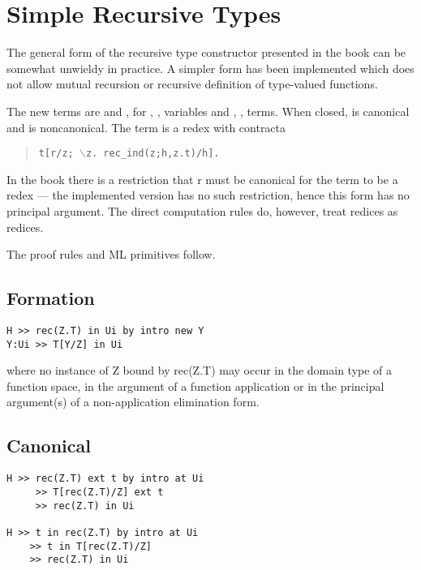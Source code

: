 


\section{Simple Recursive Types}

The general form of the recursive type constructor presented in the book
can be somewhat unwieldy in practice.  A simpler form has been
implemented which does not allow mutual recursion or recursive
definition of type-valued functions.

The new terms are  and , 
for , ,  variables and
, ,  terms.  
When closed,  is canonical and  is
noncanonical.  The term  is a redex with contracta
\begin{quote}
\tt t[r/z; $\backslash$z.  rec\_ind(z;h,z.t)/h].
\end{quote}
In the book there is a restriction
that r must be canonical for the term to be a redex --- the implemented
version has no such restriction, hence this  form has no
principal argument.  The direct computation rules do, however, treat
 redices as redices.

The proof rules and ML primitives follow.


\subsection*{Formation}

\begin{verbatim}
H >> rec(Z.T) in Ui by intro new Y
Y:Ui >> T[Y/Z] in Ui
\end{verbatim}
where no instance of Z bound by rec(Z.T) may occur in the domain type of
a function space, in the argument of a function application or in the
principal argument(s) of a non-application elimination form.


\subsection*{Canonical}                                            

\begin{verbatim}
H >> rec(Z.T) ext t by intro at Ui
     >> T[rec(Z.T)/Z] ext t
     >> rec(Z.T) in Ui

H >> t in rec(Z.T) by intro at Ui
    >> t in T[rec(Z.T)/Z]
    >> rec(Z.T) in Ui
\end{verbatim}

